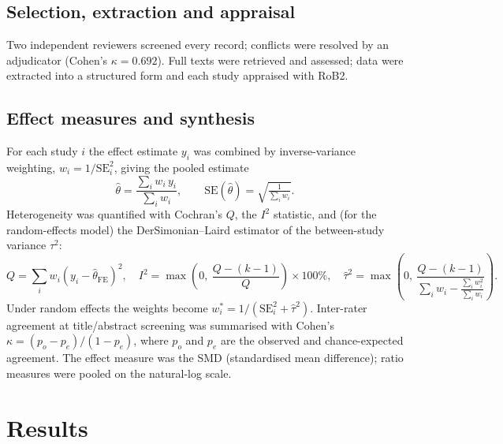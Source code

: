 \documentclass[11pt]{article}
\begin{document}
\subsection{Selection, extraction and appraisal}
Two independent reviewers screened every record; conflicts were resolved by an adjudicator (Cohen's $\kappa = 0.692$). Full texts were retrieved and assessed; data were extracted into a structured form and each study appraised with RoB2.
\subsection{Effect measures and synthesis}
For each study $i$ the effect estimate $y_i$ was combined by inverse-variance weighting, $w_i = 1/\mathrm{SE}_i^2$, giving the pooled estimate
\begin{equation}
\hat{\theta} = \frac{\sum_i w_i\, y_i}{\sum_i w_i}, \qquad \mathrm{SE}(\hat{\theta}) = \sqrt{\tfrac{1}{\sum_i w_i}}.
\end{equation}
Heterogeneity was quantified with Cochran's $Q$, the $I^2$ statistic, and (for the random-effects model) the DerSimonian--Laird estimator of the between-study variance $\tau^2$:
\begin{equation}
Q = \sum_i w_i (y_i-\hat{\theta}_{\mathrm{FE}})^2, \quad I^2 = \max\!\left(0,\ \frac{Q-(k-1)}{Q}\right)\times 100\%, \quad \hat{\tau}^2 = \max\!\left(0,\ \frac{Q-(k-1)}{\sum_i w_i - \frac{\sum_i w_i^2}{\sum_i w_i}}\right).
\end{equation}
Under random effects the weights become $w_i^{*} = 1/(\mathrm{SE}_i^2 + \hat{\tau}^2)$. 
Inter-rater agreement at title/abstract screening was summarised with Cohen's $\kappa = (p_o - p_e)/(1 - p_e)$, where $p_o$ and $p_e$ are the observed and chance-expected agreement.
The effect measure was the SMD (standardised mean difference); ratio measures were pooled on the natural-log scale.
\section{Results}
\end{document}
